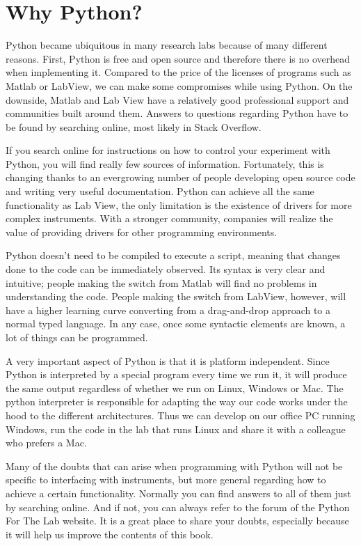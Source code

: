 \section{Why Python?}
Python became ubiquitous in many research labs because of many different reasons. First, Python is free and open source and therefore there is no overhead when implementing it. Compared to the price of the licenses of programs such as Matlab or LabView, we can make some compromises while using Python. On the downside, Matlab and Lab View have a relatively good professional support and communities built around them. Answers to questions regarding Python have to be found by searching online, most likely in Stack Overflow.

If you search online for instructions on how to control your experiment with Python, you will find really few sources of information. Fortunately, this is changing thanks to an evergrowing number of people developing open source code and writing very useful documentation. Python can achieve all the same functionality as Lab View, the only limitation is the existence of drivers for more complex instruments. With a stronger community, companies will realize the value of providing drivers for other programming environments.

Python doesn’t need to be compiled to execute a script, meaning that changes done to the code can be immediately observed. Its syntax is very clear and intuitive; people making the switch from Matlab will find no problems in understanding the code. People making the switch from LabView, however, will have a higher learning curve converting from a drag-and-drop approach to a normal typed language. In any case, once some syntactic elements are known, a lot of things can be programmed.

A very important aspect of Python is that it is platform independent. Since Python is interpreted by a special program every time we run it, it will produce the same output regardless of whether we run on Linux, Windows or Mac. The python interpreter is responsible for adapting the way our code works under the hood to the different architectures. Thus we can develop on our office PC running Windows, run the code in the lab that runs Linux and share it with a colleague who prefers a Mac.

Many of the doubts that can arise when programming with Python will not be specific to interfacing with instruments, but more general regarding how to achieve a certain functionality. Normally you can find answers to all of them just by searching online. And if not, you can always refer to the forum of the Python For The Lab website. It is a great place to share your doubts, especially because it will help us improve the contents of this book.

